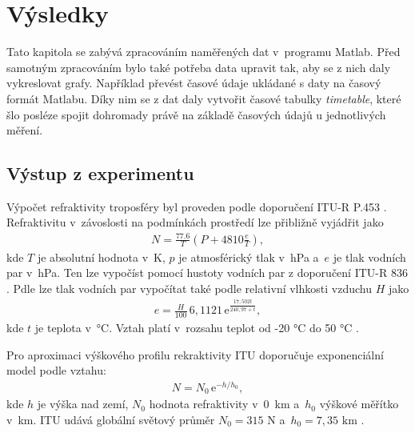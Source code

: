 \documentclass[twoside]{ctuthesis}
\newcommand{\mt}[1]{\text{#1}}
\theoremstyle{plain}
\theoremstyle{definition}
\theoremstyle{note}
\begin{document}
\chapter{Výsledky}
	Tato kapitola se zabývá zpracováním naměřených dat v~programu Matlab. Před samotným zpracováním bylo také potřeba data upravit tak, aby se z nich daly vykreslovat grafy. Například převést časové údaje ukládané s daty na časový formát Matlabu. Díky nim se z dat daly vytvořit časové tabulky \textit{timetable}, které šlo posléze spojit dohromady právě na základě časových údajů u jednotlivých měření. 

	\section{Výstup z experimentu}


	Výpočet refraktivity troposféry byl proveden podle doporučení ITU-R P.453 \cite{ITU:refrac}. Refraktivitu v~závoslosti na podmínkách prostředí lze přibližně vyjádřit jako
	\begin{align}
		N = \frac{77.6}{T} \left(P + 4810\frac{e}{T}\right),
		\label{eq:refr:meas}
	\end{align}
	kde $T$ je absolutní hodnota v~K, $p$ je atmosférický tlak v~hPa a~$e$ je tlak vodních par v~hPa. Ten lze vypočíst pomocí hustoty vodních par z doporučení ITU-R 836 \cite{ITU:vapour}. Pdle \cite{ITU:refrac} lze tlak vodních par vypočítat také podle relativní vlhkosti vzduchu $H$ jako
	\begin{align}
		e = \frac{H}{100}\,6{,}1121\,\mt{e}^{\frac{17{,}502t}{240{,}97 + t}},
	\end{align}
	kde $t$ je teplota v~°C. Vztah platí v~rozsahu teplot od -20 °C do 50 °C \cite{zaklady:sireni:vln}.

	Pro aproximaci výškového profilu rekraktivity ITU doporučuje \cite{ITU:refrac} exponenciální model podle vztahu:
	\begin{align}
		N = N_\mt{0}\,\mt{e}^{-h/h_\mt{0}},
		\label{eq:refr:approx}
	\end{align}
	kde $h$ je výška nad zemí, $N_\mt{0}$ hodnota refraktivity v~0~km a~$h_\mt{0}$ výškové měřítko v~km. ITU udává globální světový průměr $N_\mt{0} = 315 \mt{ N}$ a~$h_\text{0} = 7{,}35 \mt{ km}$ \cite{zaklady:sireni:vln}.
\end{document}
